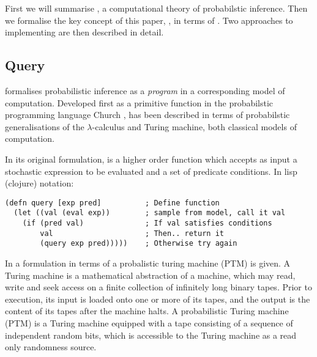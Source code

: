 First we will summarise , a computational theory of probabilstic inference.
Then we formalise the key concept of this paper, , in terms of .
Two approaches to implementing  are then described in detail.

\subsection{Query}

 formalises probabilistic inference as a \textit{program} in a corresponding model of computation.
Developed first as a primitive function in the probabilstic programming language Church \citep{church},  has been described in terms of probabilstic generalisations of the $\lambda$-calculus and Turing machine, both classical models of computation.

In its original formulation,  is a higher order function which accepts as input a stochastic expression to be evaluated and a set of predicate conditions.
In lisp (clojure) notation:

\begin{verbatim}
(defn query [exp pred]          ; Define function
  (let ((val (eval exp))        ; sample from model, call it val
    (if (pred val)              ; If val satisfies conditions
        val                     ; Then.. return it
        (query exp pred)))))    ; Otherwise try again
\end{verbatim}

In \citep{freer} a formulation in terms of a probalistic turing machine (PTM) is given.
A Turing machine \citep{turing} is a mathematical abstraction of a machine, which may read, write and seek access on a finite collection of infinitely long binary tapes.
Prior to execution, its input is loaded onto one or more of its tapes, and the output is the content of its tapes after the machine halts.
A probabilistic Turing machine (PTM) is a Turing machine equipped with a tape consisting of a sequence of independent random bits, which is accessible to the Turing machine as a read only randomness source.

